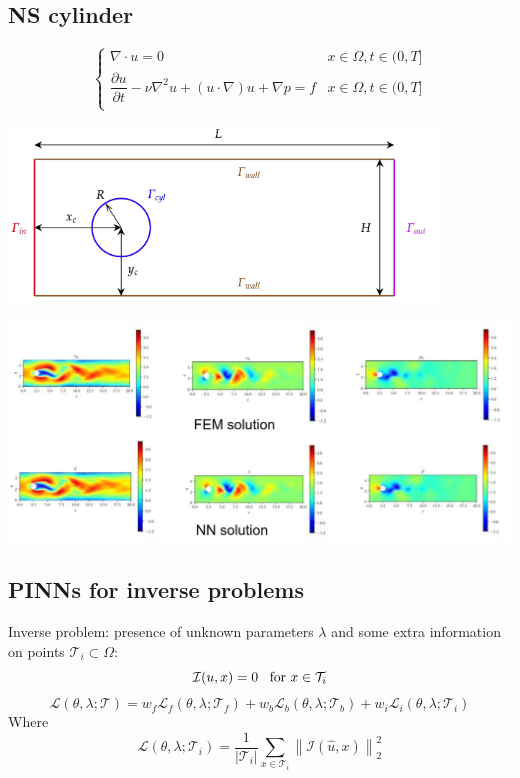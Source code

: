 \subsection{NS cylinder}
\[
    \begin{cases}
        \nabla \cdot u = 0 & x \in \Omega, t \in (0, T]\\
        \dfrac{\partial u}{\partial t} - \nu \nabla^2 u + (u \cdot \nabla)u + \nabla p = f & x \in \Omega, t \in (0, T]\\
    \end{cases}
\]
\begin{center}
    \includegraphics[scale=0.3]{../images/NS_Cylinder1.png}
\end{center}
\begin{center}
    \includegraphics[scale=0.3]{../images/FEM_PINN_Solution.png}
\end{center}

\subsection{PINNs for inverse problems}
Inverse problem: presence of unknown parameters $\lambda$ and some extra information on points $\mathcal{T}_i \subset \Omega$:
\[
    \mathcal{I}(u,x) = 0 \hspace{0.3cm}\text{for } x \in \mathcal{T}_i    
\]
\[
    \mathcal{L}(\theta, \lambda; \mathcal{T}) = w_f \mathcal{L}_f(\theta, \lambda; \mathcal{T}_f) + w_b \mathcal{L}_b(\theta, \lambda; \mathcal{T}_b) + w_i \mathcal{L}_i(\theta, \lambda; \mathcal{T}_i)    
\]
Where
\[
    \mathcal{L}(\theta, \lambda; \mathcal{T}_i) = \dfrac{1}{|\mathcal{T}_i|} \sum_{x \in \mathcal{T}_i} \left\|\mathcal{I}(\hat{u},x)\right\|^2_2
\]